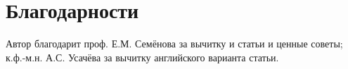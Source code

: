 \documentclass[11pt,twoside,draft
]{article}
\begin{document}
\section{Благодарности}
Автор благодарит проф. Е.М. Семёнова за вычитку и статьи и ценные советы;
к.ф.-м.н. А.С. Усачёва за вычитку английского варианта статьи.













\label{end}
\end{document}
